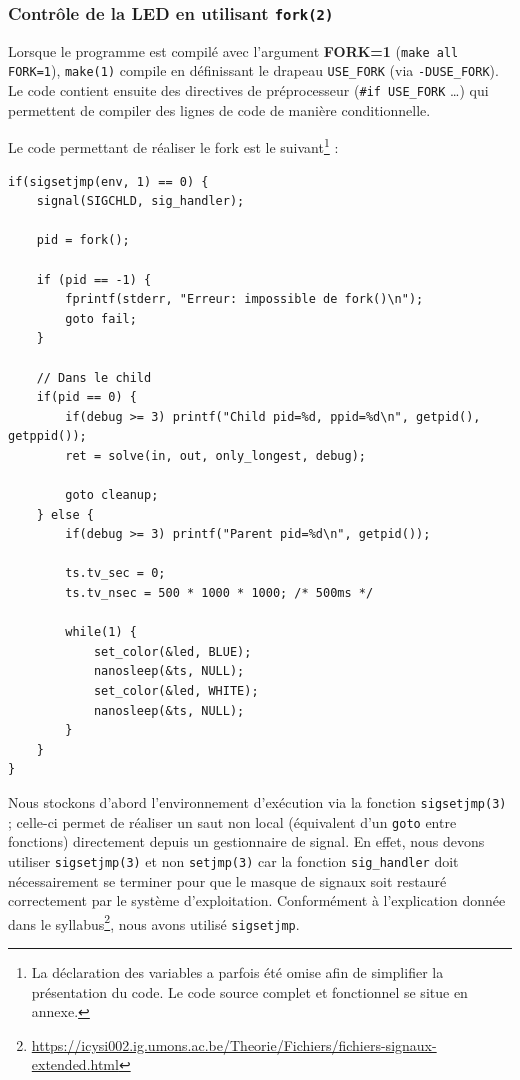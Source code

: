 \documentclass[a4paper,11pt]{article}
\begin{document}
\subsubsection{Contrôle de la LED en utilisant \texttt{fork(2)}}

Lorsque le programme est compilé avec l'argument \textbf{FORK=1} (\texttt{make all FORK=1}), \texttt{make(1)} compile en définissant le drapeau \texttt{USE\_FORK} (via \texttt{-DUSE\_FORK}). Le code contient ensuite des directives de préprocesseur (\texttt{\#if USE\_FORK} \ldots) qui permettent de compiler des lignes de code de manière conditionnelle.

Le code permettant de réaliser le fork est le suivant\footnote{La déclaration des variables a parfois été omise afin de simplifier la présentation du code. Le code source complet et fonctionnel se situe en annexe.} :

\begin{verbatim}
if(sigsetjmp(env, 1) == 0) {
    signal(SIGCHLD, sig_handler);

    pid = fork();

    if (pid == -1) {
        fprintf(stderr, "Erreur: impossible de fork()\n");
        goto fail;
    }

    // Dans le child
    if(pid == 0) {
        if(debug >= 3) printf("Child pid=%d, ppid=%d\n", getpid(), getppid());
        ret = solve(in, out, only_longest, debug);
        
        goto cleanup;
    } else {
        if(debug >= 3) printf("Parent pid=%d\n", getpid());

        ts.tv_sec = 0;
        ts.tv_nsec = 500 * 1000 * 1000; /* 500ms */

        while(1) {
            set_color(&led, BLUE);
            nanosleep(&ts, NULL);
            set_color(&led, WHITE);
            nanosleep(&ts, NULL);
        }
    }
}
\end{verbatim}

Nous stockons d'abord l'environnement d'exécution via la fonction \texttt{sigsetjmp(3)} ; celle-ci permet de réaliser un saut non local (équivalent d'un \texttt{goto} entre fonctions) directement depuis un gestionnaire de signal. En effet, nous devons utiliser \texttt{sigsetjmp(3)} et non \texttt{setjmp(3)} car la fonction \texttt{sig\_handler} doit nécessairement se terminer pour que le masque de signaux soit restauré correctement par le système d'exploitation. Conformément à l'explication donnée dans le syllabus\footnote{\url{https://icysi002.ig.umons.ac.be/Theorie/Fichiers/fichiers-signaux-extended.html}}, nous avons utilisé \texttt{sigsetjmp}.
\end{document}
